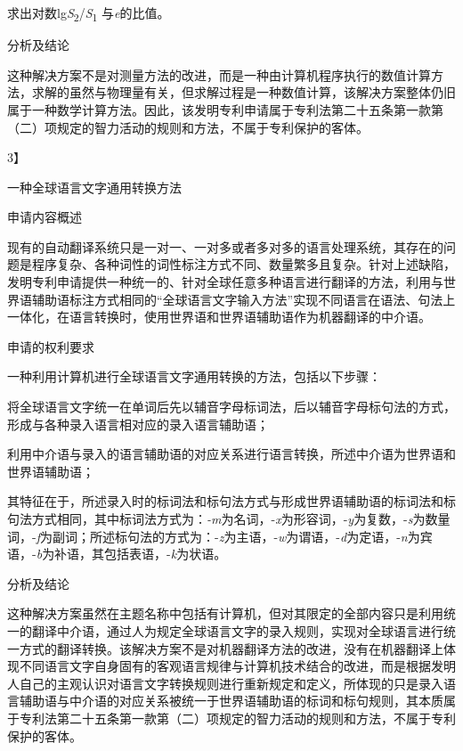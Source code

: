 求出对数lg\textit{S}\textsubscript{2}/\textit{S}\textsubscript{1} 与\textit{e}的比值。

{\setlength{\parindent}{22.5bp}分析及结论\par}

这种解决方案不是对测量方法的改进，而是一种由计算机程序执行的数值计算方法，求解的虽然与物理量有关，但求解过程是一种数值计算，该解决方案整体仍旧属于一种数学计算方法。因此，该发明专利申请属于专利法第二十五条第一款第（二）项规定的智力活动的规则和方法，不属于专利保护的客体。

{3】\par}

一种全球语言文字通用转换方法

{\setlength{\parindent}{22.5bp}申请内容概述\par}

现有的自动翻译系统只是一对一、一对多或者多对多的语言处理系统，其存在的问题是程序复杂、各种词性的词性标注方式不同、数量繁多且复杂。针对上述缺陷，发明专利申请提供一种统一的、针对全球任意多种语言进行翻译的方法，利用与世界语辅助语标注方式相同的“全球语言文字输入方法”实现不同语言在语法、句法上一体化，在语言转换时，使用世界语和世界语辅助语作为机器翻译的中介语。

{\setlength{\parindent}{22.5bp}申请的权利要求\par}

一种利用计算机进行全球语言文字通用转换的方法，包括以下步骤：

将全球语言文字统一在单词后先以辅音字母标词法，后以辅音字母标句法的方式，形成与各种录入语言相对应的录入语言辅助语；

利用中介语与录入的语言辅助语的对应关系进行语言转换，所述中介语为世界语和世界语辅助语；

其特征在于，所述录入时的标词法和标句法方式与形成世界语辅助语的标词法和标句法方式相同，其中标词法方式为：\textit{-m}为名词，-\textit{x}为形容词，-\textit{y}为复数，-\textit{s}为数量词，-\textit{f}为副词；所述标句法的方式为：-\textit{z}为主语，-\textit{w}为谓语，-\textit{d}为定语，-\textit{n}为宾语，-\textit{b}为补语，其包括表语，-\textit{k}为状语。

{\setlength{\parindent}{22.5bp}分析及结论\par}

这种解决方案虽然在主题名称中包括有计算机，但对其限定的全部内容只是利用统一的翻译中介语，通过人为规定全球语言文字的录入规则，实现对全球语言进行统一方式的翻译转换。该解决方案不是对机器翻译方法的改进，没有在机器翻译上体现不同语言文字自身固有的客观语言规律与计算机技术结合的改进，而是根据发明人自己的主观认识对语言文字转换规则进行重新规定和定义，所体现的只是录入语言辅助语与中介语的对应关系被统一于世界语辅助语的标词和标句规则，其本质属于专利法第二十五条第一款第（二）项规定的智力活动的规则和方法，不属于专利保护的客体。

